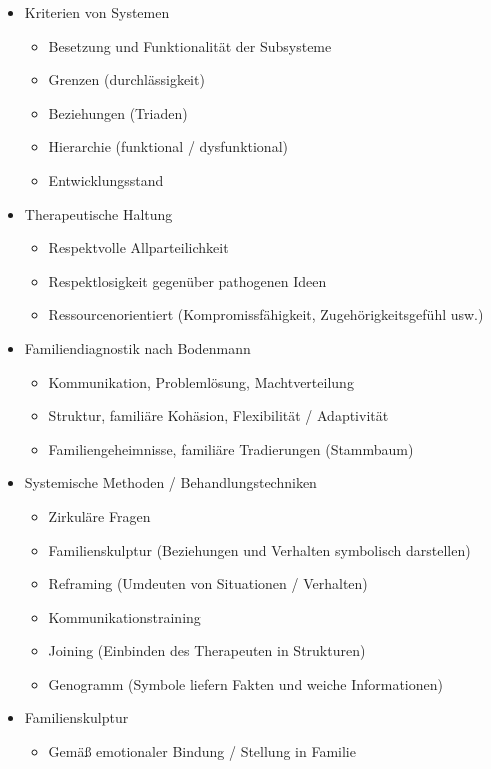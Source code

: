 \documentclass[11pt, paper=a4, twocolumn]{scrartcl}
\begin{document}
\begin{itemize}
\begin{itemize}
				\end{itemize}
			\item Kriterien von Systemen
				\begin{itemize}
					\item Besetzung und Funktionalität der Subsysteme
					\item Grenzen (durchlässigkeit)
					\item Beziehungen (Triaden)
					\item Hierarchie (funktional / dysfunktional)
					\item Entwicklungsstand
				\end{itemize}
			\item Therapeutische Haltung
				\begin{itemize}
					\item Respektvolle Allparteilichkeit
					\item Respektlosigkeit gegenüber pathogenen Ideen
					\item Ressourcenorientiert (Kompromissfähigkeit, Zugehörigkeitsgefühl usw.)
				\end{itemize}
			\item Familiendiagnostik nach Bodenmann
				\begin{itemize}
					\item Kommunikation, Problemlösung, Machtverteilung
					\item Struktur, familiäre Kohäsion, Flexibilität / Adaptivität
					\item Familiengeheimnisse, familiäre Tradierungen (Stammbaum)
				\end{itemize}
			\item Systemische Methoden / Behandlungstechniken
				\begin{itemize}
					\item Zirkuläre Fragen
					\item Familienskulptur (Beziehungen und Verhalten symbolisch darstellen)
					\item Reframing (Umdeuten von Situationen / Verhalten)
					\item Kommunikationstraining
					\item Joining (Einbinden des Therapeuten in Strukturen)
					\item Genogramm (Symbole liefern Fakten und weiche Informationen)
				\end{itemize}
			\item Familienskulptur
				\begin{itemize}
					\item Gemäß emotionaler Bindung / Stellung in Familie

\end{itemize}
\end{itemize}
\end{document}
